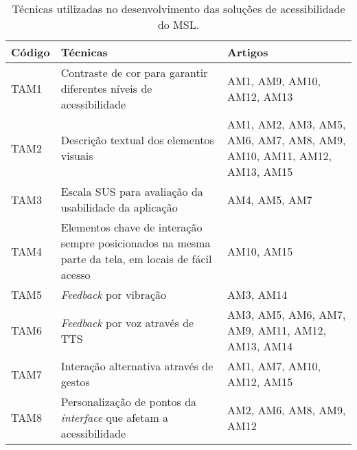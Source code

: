 \begin{table}[htb]
    \begin{center}
        \caption{Técnicas utilizadas no desenvolvimento das soluções de acessibilidade do MSL.}
        \label{tab-tec-uti-des-1}
        \begin{tabular}{p{1.2cm}|p{9.2cm}|p{4.1cm}}
            \textbf{Código} & \textbf{Técnicas}                                                                                  & \textbf{Artigos}                                                     \\
            \hline
            TAM1            & Contraste de cor para garantir diferentes níveis de acessibilidade                                 & AM1, AM9, AM10, AM12, AM13                                           \\
            \hline
            TAM2            & Descrição textual dos elementos visuais                                                            & AM1, AM2, AM3, AM5, AM6, AM7, AM8, AM9, AM10, AM11, AM12, AM13, AM15 \\
            \hline
            TAM3            & Escala SUS para avaliação da usabilidade da aplicação                                              & AM4, AM5, AM7                                                        \\
            \hline
            TAM4            & Elementos chave de interação sempre posicionados na mesma parte da tela, em locais de fácil acesso & AM10, AM15                                                           \\
            \hline
            TAM5            & \emph{Feedback} por vibração                                                                       & AM3, AM14                                                            \\
            \hline
            TAM6            & \emph{Feedback} por voz através de TTS                                                             & AM3, AM5, AM6, AM7, AM9, AM11, AM12, AM13, AM14                      \\
            \hline
            TAM7            & Interação alternativa através de gestos                                                            & AM1, AM7, AM10, AM12, AM15                                           \\
            \hline
            TAM8            & Personalização de pontos da \emph{interface} que afetam a acessibilidade                           & AM2, AM6, AM8, AM9, AM12                                             \\

\end{tabular}
\end{center}
\end{table}
